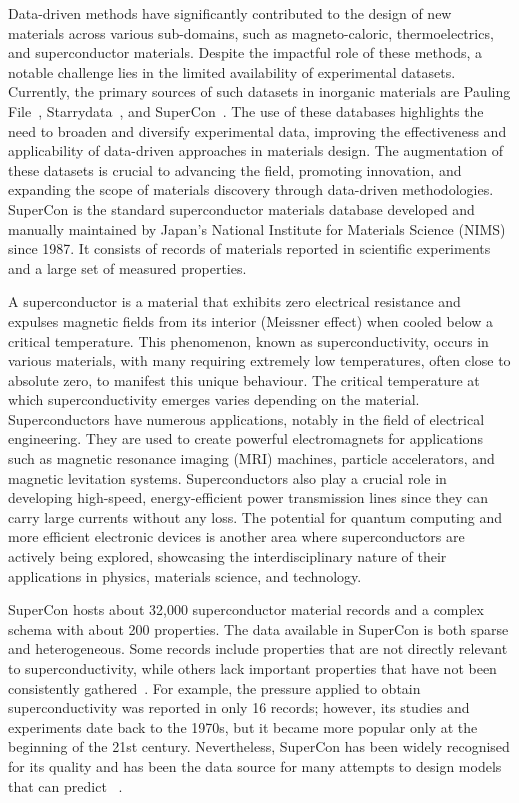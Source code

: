 Data-driven methods have significantly contributed to the design of new materials across various sub-domains, such as magneto-caloric, thermoelectrics, and superconductor materials. Despite the impactful role of these methods, a notable challenge lies in the limited availability of experimental datasets. 
Currently, the primary sources of such datasets in inorganic materials are Pauling File~\cite{Blokhin2018ThePF_paulingFile}, Starrydata~\cite{katsura2019data}, and SuperCon~\cite{ishii2023structuring}. 
The use of these databases highlights the need to broaden and diversify experimental data, improving the effectiveness and applicability of data-driven approaches in materials design. 
The augmentation of these datasets is crucial to advancing the field, promoting innovation, and expanding the scope of materials discovery through data-driven methodologies.
SuperCon is the standard superconductor materials database developed and manually maintained by Japan's National Institute for Materials Science (NIMS) since 1987. 
It consists of records of materials reported in scientific experiments and a large set of measured properties. 

A superconductor is a material that exhibits zero electrical resistance and expulses magnetic fields from its interior (Meissner effect) when cooled below a critical temperature. This phenomenon, known as superconductivity, occurs in various materials, with many requiring extremely low temperatures, often close to absolute zero, to manifest this unique behaviour. The critical temperature at which superconductivity emerges varies depending on the material. 
Superconductors have numerous applications, notably in the field of electrical engineering. They are used to create powerful electromagnets for applications such as magnetic resonance imaging (MRI) machines, particle accelerators, and magnetic levitation systems. 
Superconductors also play a crucial role in developing high-speed, energy-efficient power transmission lines since they can carry large currents without any loss. The potential for quantum computing and more efficient electronic devices is another area where superconductors are actively being explored, showcasing the interdisciplinary nature of their applications in physics, materials science, and technology.

SuperCon hosts about 32,000 superconductor material records and a complex schema with about 200 properties. 
The data available in SuperCon is both sparse and heterogeneous. Some records include properties that are not directly relevant to superconductivity, while others lack important properties that have not been consistently gathered~\cite{sommer20223dsc}.
For example, the pressure applied to obtain superconductivity was reported in only 16 records; however, its studies and experiments date back to the 1970s, but it became more popular only at the beginning of the 21st century.  
Nevertheless, SuperCon has been widely recognised for its quality and has been the data source for many attempts to design models that can predict \tc~\cite{stanev2017machine, le2020critical, Hamlin2019SuperconductivityNR}. 

